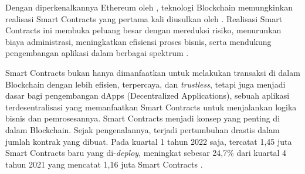 Dengan diperkenalkannya Ethereum oleh \cite{buterin2013ethereum}, teknologi Blockchain memungkinkan realisasi Smart Contracts yang pertama kali diusulkan oleh \cite{szabo1997formalizing}. Realisasi Smart Contracts ini membuka peluang besar dengan mereduksi risiko, menurunkan biaya administrasi, meningkatkan efisiensi proses bisnis, serta mendukung pengembangan aplikasi dalam berbagai spektrum \parencite{zheng2020overview}. 

Smart Contracts bukan hanya dimanfaatkan untuk melakukan transaksi di dalam Blockchain dengan lebih efisien, terpercaya, dan \textit{trustless}, tetapi juga menjadi dasar bagi pengembangan dApps (Decentralized Applications), sebuah aplikasi terdesentralisasi yang memanfaatkan Smart Contracts untuk menjalankan logika bisnis dan pemrosesannya. Smart Contracts menjadi konsep yang penting di dalam Blockchain. Sejak pengenalannya, terjadi pertumbuhan drastis dalam jumlah kontrak yang dibuat. Pada kuartal 1 tahun 2022 saja, tercatat 1,45 juta Smart Contracts baru yang di-\textit{deploy}, meningkat sebesar 24,7\% dari kuartal 4 tahun 2021 yang mencatat 1,16 juta Smart Contracts \parencite{alchemy_ethereum_statistics}. 

